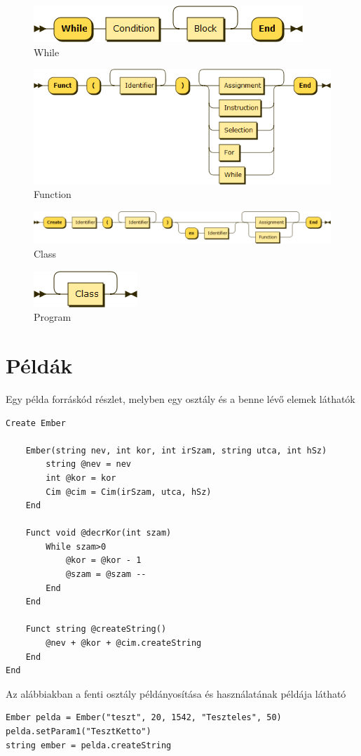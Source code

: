 \begin{figure}[h!]
\centering
\includegraphics[scale=0.4]{kepek/rr_while.png}
\caption{While}
\label{fig:rr_while}
\end{figure}

\begin{figure}[h!]
\centering
\includegraphics[scale=0.4]{kepek/rr_function.png}
\caption{Function}
\label{fig:rr_function}
\end{figure}

\begin{figure}[h!]
\centering
\includegraphics[scale=0.4]{kepek/rr_class.png}
\caption{Class}
\label{fig:rr_class}
\end{figure}

\begin{figure}[h!]
\centering
\includegraphics[scale=1]{kepek/rr_program.png}
\caption{Program}
\label{fig:rr_program}
\end{figure}

\section{Példák}

Egy példa forráskód részlet, melyben egy osztály és a benne lévő elemek láthatók

\begin{verbatim}
Create Ember
	
	Ember(string nev, int kor, int irSzam, string utca, int hSz)
		string @nev = nev
		int @kor = kor
		Cim @cim = Cim(irSzam, utca, hSz)
	End
		
	Funct void @decrKor(int szam)
		While szam>0
			@kor = @kor - 1
			@szam = @szam --
		End
	End
	
	Funct string @createString()
		@nev + @kor + @cim.createString
	End
End
\end{verbatim}
		
Az alábbiakban a fenti osztály példányosítása és használatának példája látható

\begin{verbatim}
Ember pelda = Ember("teszt", 20, 1542, "Teszteles", 50)
pelda.setParam1("TesztKetto")
string ember = pelda.createString
\end{verbatim}
